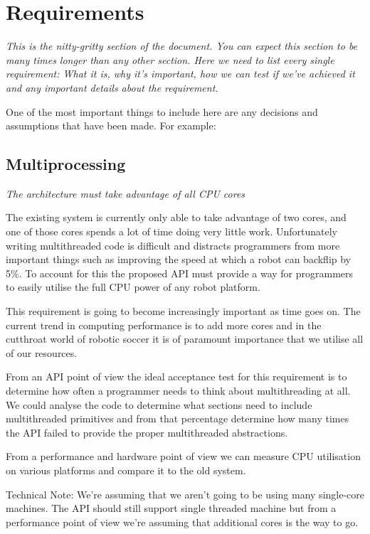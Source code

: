 \documentclass[english,12pt]{scrartcl}
\newcommand{\requirement}[1]{\textit{#1}}
\begin{document}
	\section{Requirements}
		
		{
		\em %
		This is the nitty-gritty section of the document. You can expect this section to be many
		times longer than any other section. Here we need to list every single requirement: What it
		is, why it's important, how we can test if we've achieved it and any important details about
		the requirement.

		One of the most important things to include here are any decisions and assumptions that have
		been made. For example:
		}

		\subsection{Multiprocessing}
			\requirement{The architecture must take advantage of all CPU cores}

			The existing system is currently only able to take advantage of two cores, and one of
			those cores spends a lot of time doing very little work. Unfortunately writing
			multithreaded code is difficult and distracts programmers from more important things
			such as improving the speed at which a robot can backflip by 5\%. To account for this
			the proposed API must provide a way for programmers to easily utilise the full CPU power
			of any robot platform.

			This requirement is going to become increasingly important as time goes on. The current
			trend in computing performance is to add more cores and in the cutthroat world of
			robotic soccer it is of paramount importance that we utilise all of our resources.

			From an API point of view the ideal acceptance test for this requirement is to determine
			how often a programmer needs to think about multithreading at all. We could analyse the
			code to determine what sections need to include multithreaded primitives and from that
			percentage determine how many times the API failed to provide the proper multithreaded
			abstractions.

			From a performance and hardware point of view we can measure CPU utilisation on various
			platforms and compare it to the old system.

			Technical Note: We're assuming that we aren't going to be using many single-core
			machines. The API should still support single threaded machine but from a performance
			point of view we're assuming that additional cores is the way to go.
\end{document}
